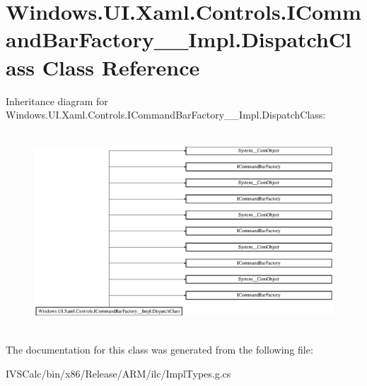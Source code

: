 \hypertarget{class_windows_1_1_u_i_1_1_xaml_1_1_controls_1_1_i_command_bar_factory_____impl_1_1_dispatch_class}{}\section{Windows.\+U\+I.\+Xaml.\+Controls.\+I\+Command\+Bar\+Factory\+\_\+\+\_\+\+Impl.\+Dispatch\+Class Class Reference}
\label{class_windows_1_1_u_i_1_1_xaml_1_1_controls_1_1_i_command_bar_factory_____impl_1_1_dispatch_class}
Inheritance diagram for Windows.\+U\+I.\+Xaml.\+Controls.\+I\+Command\+Bar\+Factory\+\_\+\+\_\+\+Impl.\+Dispatch\+Class\+:\begin{figure}[H]
\begin{center}
\leavevmode
\includegraphics[height=7.439613cm]{class_windows_1_1_u_i_1_1_xaml_1_1_controls_1_1_i_command_bar_factory_____impl_1_1_dispatch_class}
\end{center}
\end{figure}


The documentation for this class was generated from the following file\+:\begin{DoxyCompactItemize}
\item 
I\+V\+S\+Calc/bin/x86/\+Release/\+A\+R\+M/ilc/Impl\+Types.\+g.\+cs\end{DoxyCompactItemize}
